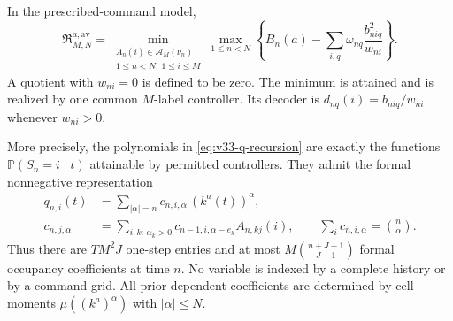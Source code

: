 \begin{theorem}
\label{thm:v33-moment-program}
In the prescribed-command model,
\begin{equation}\label{eq:v33-exact-value}
 \mathfrak R_{M,N}^{a,\mathrm{av}}
  =\min_{\substack{A_n(i)\in\mathscr A_M(\nu_n)\\1\le n<N,\ 1\le i\le M}}
       \max_{1\le n<N}
       \left\{B_n(a)-\sum_{i,q}\omega_{nq}
                        \frac{b_{niq}^2}{w_{ni}}\right\}.
\end{equation}
A quotient with $w_{ni}=0$ is defined to be zero. The minimum is
attained and is realized by one common $M$-label controller. Its decoder
is $d_{nq}(i)=b_{niq}/w_{ni}$ whenever $w_{ni}>0$.

More precisely, the polynomials in \eqref{eq:v33-q-recursion} are
exactly the functions
$\mathbb P(S_n=i\mid t)$ attainable by permitted controllers. They
admit the formal nonnegative representation
\begin{equation}\label{eq:v33-formal-recursion}
 \begin{split}
 q_{n,i}(t)&=\sum_{|\alpha|=n}c_{n,i,\alpha}\,(k^a(t))^\alpha,\\
 c_{n,j,\alpha}
    &=\sum_{i,k:\,\alpha_k>0}
          c_{n-1,i,\alpha-e_k}A_{n,kj}(i),\qquad
 \sum_i c_{n,i,\alpha}=\binom n\alpha.
 \end{split}
\end{equation}
Thus there are $TM^2J$ one-step entries and at most
$M\binom{n+J-1}{J-1}$ formal occupancy coefficients at time $n$.
No variable is indexed by a complete history or by a command grid.
All prior-dependent coefficients are determined by cell moments
$\mu((k^a)^\alpha)$ with $|\alpha|\le N$.
\end{theorem}
